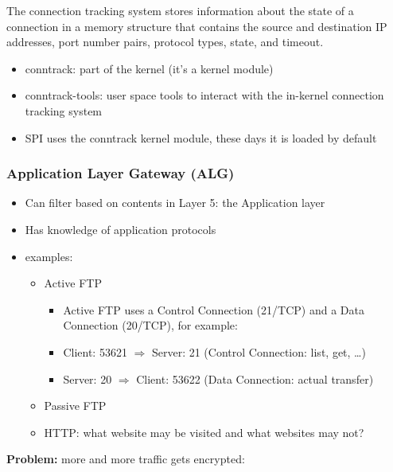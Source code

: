 \documentclass{article}
\begin{document}
The connection tracking system stores information 
about the state of a connection in a memory structure that 
contains the source and destination IP addresses, port number pairs, 
protocol types, state, and timeout.

\begin{itemize}
    \item conntrack: part of the kernel (it's a kernel module)
    \item conntrack-tools: user space tools to interact with the in-kernel connection tracking system
    \item SPI uses the conntrack kernel module, these days it is loaded by default
\end{itemize}

\subsubsection{Application Layer Gateway (ALG)}

\begin{itemize}
    \item Can filter based on contents in Layer 5: the Application layer
    \item Has knowledge of application protocols
    \item examples:
    \begin{itemize}
        \item Active FTP
        \begin{itemize}
            \item Active FTP uses a Control Connection (21/TCP) and a Data Connection (20/TCP), for example:
            \item Client: 53621 $\Rightarrow$ Server: 21 (Control Connection: list, get, \dots)
            \item Server: 20 $\Rightarrow$ Client: 53622 (Data Connection: actual transfer)
        \end{itemize}
        \item Passive FTP
        \item HTTP: what website may be visited and what websites may not?
    \end{itemize}
\end{itemize}

\textbf{Problem:} more and more traffic gets encrypted:
\end{document}
